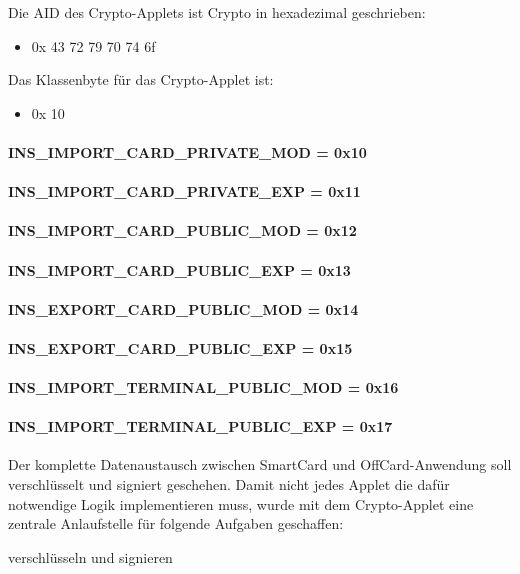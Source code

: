 Die AID des Crypto-Applets ist Crypto in hexadezimal geschrieben:
\begin{itemize}
	\item 0x 43 72 79 70 74 6f
\end{itemize}
Das Klassenbyte für das Crypto-Applet ist:
\begin{itemize}
	\item 0x 10
\end{itemize}

\paragraph{INS\_IMPORT\_CARD\_PRIVATE\_MOD = 0x10}
\paragraph{INS\_IMPORT\_CARD\_PRIVATE\_EXP = 0x11}
\paragraph{INS\_IMPORT\_CARD\_PUBLIC\_MOD = 0x12}
\paragraph{INS\_IMPORT\_CARD\_PUBLIC\_EXP = 0x13}
\paragraph{INS\_EXPORT\_CARD\_PUBLIC\_MOD = 0x14}
\paragraph{INS\_EXPORT\_CARD\_PUBLIC\_EXP = 0x15}
\paragraph{INS\_IMPORT\_TERMINAL\_PUBLIC\_MOD = 0x16}
\paragraph{INS\_IMPORT\_TERMINAL\_PUBLIC\_EXP = 0x17}


Der komplette Datenaustausch zwischen SmartCard und OffCard-Anwendung soll verschlüsselt und signiert geschehen. 
Damit nicht jedes Applet die dafür notwendige Logik implementieren muss, wurde mit dem Crypto-Applet eine zentrale Anlaufstelle für folgende Aufgaben geschaffen:

verschlüsseln und signieren

